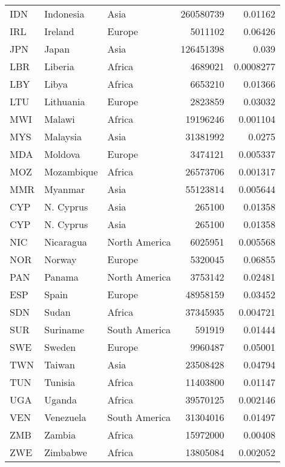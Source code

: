 \begin{table}[h!]
\begin{tabular}{lllrr}
        IDN     & Indonesia     & Asia          & 260580739 & 0.01162       \\
        IRL     & Ireland       & Europe        & 5011102   & 0.06426       \\
        JPN     & Japan         & Asia          & 126451398 & 0.039         \\
        LBR     & Liberia       & Africa        & 4689021   & 0.0008277     \\
        LBY     & Libya         & Africa        & 6653210   & 0.01366       \\
        LTU     & Lithuania     & Europe        & 2823859   & 0.03032       \\
        MWI     & Malawi        & Africa        & 19196246  & 0.001104      \\
        MYS     & Malaysia      & Asia          & 31381992  & 0.0275        \\
        MDA     & Moldova       & Europe        & 3474121   & 0.005337      \\
        MOZ     & Mozambique    & Africa        & 26573706  & 0.001317      \\
        MMR     & Myanmar       & Asia          & 55123814  & 0.005644      \\
        CYP     & N. Cyprus     & Asia          & 265100    & 0.01358       \\
        CYP     & N. Cyprus     & Asia          & 265100    & 0.01358       \\
        NIC     & Nicaragua     & North America & 6025951   & 0.005568      \\
        NOR     & Norway        & Europe        & 5320045   & 0.06855       \\
        PAN     & Panama        & North America & 3753142   & 0.02481       \\
        ESP     & Spain         & Europe        & 48958159  & 0.03452       \\
        SDN     & Sudan         & Africa        & 37345935  & 0.004721      \\
        SUR     & Suriname      & South America & 591919    & 0.01444       \\
        SWE     & Sweden        & Europe        & 9960487   & 0.05001       \\
        TWN     & Taiwan        & Asia          & 23508428  & 0.04794       \\
        TUN     & Tunisia       & Africa        & 11403800  & 0.01147       \\
        UGA     & Uganda        & Africa        & 39570125  & 0.002146      \\
        VEN     & Venezuela     & South America & 31304016  & 0.01497       \\
        ZMB     & Zambia        & Africa        & 15972000  & 0.00408       \\
        ZWE     & Zimbabwe      & Africa        & 13805084  & 0.002052      \\
        \bottomrule
    \end{tabular}
\end{table}
